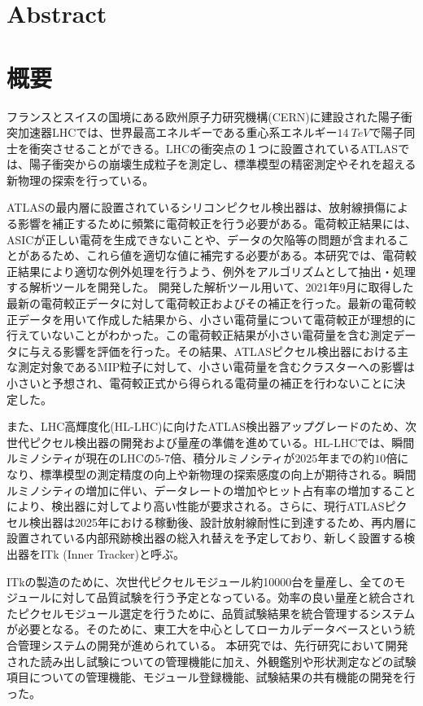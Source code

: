 \chapter*{Abstract}





\newpage

\chapter*{概要}

フランスとスイスの国境にある欧州原子力研究機構(CERN)に建設された陽子衝突加速器LHCでは、世界最高エネルギーである重心系エネルギー$14\ \si{TeV}$で陽子同士を衝突させることができる。LHCの衝突点の１つに設置されているATLASでは、陽子衝突からの崩壊生成粒子を測定し、標準模型の精密測定やそれを超える新物理の探索を行っている。

ATLASの最内層に設置されているシリコンピクセル検出器は、放射線損傷による影響を補正するために頻繁に電荷較正を行う必要がある。電荷較正結果には、ASICが正しい電荷を生成できないことや、データの欠陥等の問題が含まれることがあるため、これら値を適切な値に補完する必要がある。本研究では、電荷較正結果により適切な例外処理を行うよう、例外をアルゴリズムとして抽出・処理する解析ツールを開発した。
開発した解析ツール用いて、2021年9月に取得した最新の電荷較正データに対して電荷較正およびその補正を行った。最新の電荷較正データを用いて作成した結果から、小さい電荷量について電荷較正が理想的に行えていないことがわかった。この電荷較正結果が小さい電荷量を含む測定データに与える影響を評価を行った。その結果、ATLASピクセル検出器における主な測定対象であるMIP粒子に対して、小さい電荷量を含むクラスターへの影響は小さいと予想され、電荷較正式から得られる電荷量の補正を行わないことに決定した。

また、LHC高輝度化(HL-LHC)に向けたATLAS検出器アップグレードのため、次世代ピクセル検出器の開発および量産の準備を進めている。HL-LHCでは、瞬間ルミノシティが現在のLHCの$5$-$7$倍、積分ルミノシティが$2025$年までの約$10$倍になり、標準模型の測定精度の向上や新物理の探索感度の向上が期待される。瞬間ルミノシティの増加に伴い、データレートの増加やヒット占有率の増加することにより、検出器に対してより高い性能が要求される。さらに、現行ATLASピクセル検出器は2025年における稼動後、設計放射線耐性に到達するため、再内層に設置されている内部飛跡検出器の総入れ替えを予定しており、新しく設置する検出器をITk (Inner Tracker)と呼ぶ。

ITkの製造のために、次世代ピクセルモジュール約10000台を量産し、全てのモジュールに対して品質試験を行う予定となっている。効率の良い量産と統合されたピクセルモジュール選定を行うために、品質試験結果を統合管理するシステムが必要となる。そのために、東工大を中心としてローカルデータベースという統合管理システムの開発が進められている。
本研究では、先行研究において開発された読み出し試験についての管理機能に加え、外観鑑別や形状測定などの試験項目についての管理機能、モジュール登録機能、試験結果の共有機能の開発を行った。

